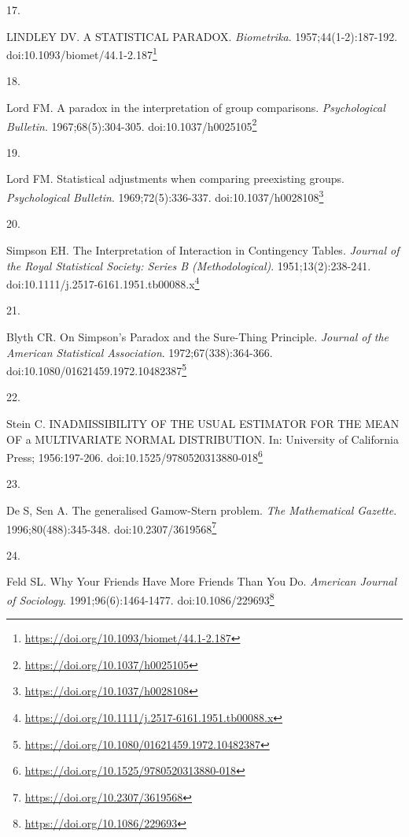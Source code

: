\documentclass[
  a4paper,
]{book}
\newlength{\cslhangindent}
\newlength{\csllabelwidth}
\newlength{\cslentryspacingunit} %
\newenvironment{CSLReferences}[2] %
 {%
  \setlength{\parindent}{0pt}
  \ifodd #1
  \let\oldpar\par
  \def\par{\hangindent=\cslhangindent\oldpar}
  \fi
  \setlength{\parskip}{#2\cslentryspacingunit}
 }%
 {}
\newcommand{\CSLLeftMargin}[1]{\parbox[t]{\csllabelwidth}{#1}}
\newcommand{\CSLRightInline}[1]{\parbox[t]{\linewidth - \csllabelwidth}{#1}\break}
\renewcommand{\href}[2]{#2\footnote{\url{#1}}}
\begin{document}
\begin{CSLReferences}{0}{0}
\leavevmode{}%
\CSLLeftMargin{17. }%
\CSLRightInline{LINDLEY DV. A STATISTICAL PARADOX. \emph{Biometrika}. 1957;44(1-2):187-192. doi:\href{https://doi.org/10.1093/biomet/44.1-2.187}{10.1093/biomet/44.1-2.187}}

\leavevmode{}%
\CSLLeftMargin{18. }%
\CSLRightInline{Lord FM. A paradox in the interpretation of group comparisons. \emph{Psychological Bulletin}. 1967;68(5):304-305. doi:\href{https://doi.org/10.1037/h0025105}{10.1037/h0025105}}

\leavevmode{}%
\CSLLeftMargin{19. }%
\CSLRightInline{Lord FM. Statistical adjustments when comparing preexisting groups. \emph{Psychological Bulletin}. 1969;72(5):336-337. doi:\href{https://doi.org/10.1037/h0028108}{10.1037/h0028108}}

\leavevmode{}%
\CSLLeftMargin{20. }%
\CSLRightInline{Simpson EH. The Interpretation of Interaction in Contingency Tables. \emph{Journal of the Royal Statistical Society: Series B (Methodological)}. 1951;13(2):238-241. doi:\href{https://doi.org/10.1111/j.2517-6161.1951.tb00088.x}{10.1111/j.2517-6161.1951.tb00088.x}}

\leavevmode{}%
\CSLLeftMargin{21. }%
\CSLRightInline{Blyth CR. On Simpson's Paradox and the Sure-Thing Principle. \emph{Journal of the American Statistical Association}. 1972;67(338):364-366. doi:\href{https://doi.org/10.1080/01621459.1972.10482387}{10.1080/01621459.1972.10482387}}

\leavevmode{}%
\CSLLeftMargin{22. }%
\CSLRightInline{Stein C. INADMISSIBILITY OF THE USUAL ESTIMATOR FOR THE MEAN OF a MULTIVARIATE NORMAL DISTRIBUTION. In: University of California Press; 1956:197-206. doi:\href{https://doi.org/10.1525/9780520313880-018}{10.1525/9780520313880-018}}

\leavevmode{}%
\CSLLeftMargin{23. }%
\CSLRightInline{De S, Sen A. The generalised Gamow-Stern problem. \emph{The Mathematical Gazette}. 1996;80(488):345-348. doi:\href{https://doi.org/10.2307/3619568}{10.2307/3619568}}

\leavevmode{}%
\CSLLeftMargin{24. }%
\CSLRightInline{Feld SL. Why Your Friends Have More Friends Than You Do. \emph{American Journal of Sociology}. 1991;96(6):1464-1477. doi:\href{https://doi.org/10.1086/229693}{10.1086/229693}}


\end{CSLReferences}
\end{document}

